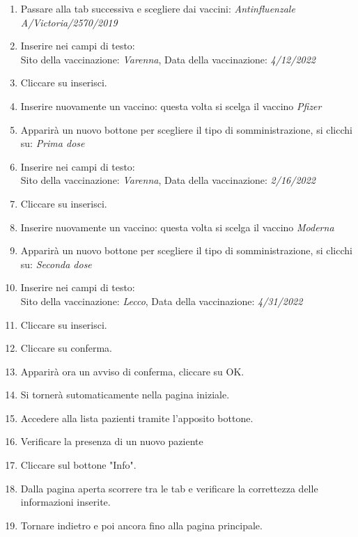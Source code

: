 \documentclass[11pt]{article}
\begin{document}
\begin{enumerate}
                \item Passare alla tab successiva e scegliere dai vaccini: \textit{Antinfluenzale A/Victoria/2570/2019}
                \item Inserire nei campi di testo:\\
                        Sito della vaccinazione: \textit{Varenna}, Data della vaccinazione: \textit{4/12/2022}
                \item Cliccare su inserisci.
                \item Inserire nuovamente un vaccino: questa volta si scelga il vaccino \textit{Pfizer}
                \item Apparirà un nuovo bottone per scegliere il tipo di somministrazione, si clicchi su: \textit{Prima dose}
                \item Inserire nei campi di testo:\\
                    Sito della vaccinazione: \textit{Varenna}, Data della vaccinazione: \textit{2/16/2022}
                \item Cliccare su inserisci.
                \item Inserire nuovamente un vaccino: questa volta si scelga il vaccino \textit{Moderna}
                \item Apparirà un nuovo bottone per scegliere il tipo di somministrazione, si clicchi su: \textit{Seconda dose}
                \item Inserire nei campi di testo:\\
                    Sito della vaccinazione: \textit{Lecco}, Data della vaccinazione: \textit{4/31/2022}
                \item Cliccare su inserisci.
                \item Cliccare su conferma.
                \item Apparirà ora un avviso di conferma, cliccare su OK.
                \item Si tornerà sutomaticamente nella pagina iniziale. 
                \item Accedere alla lista pazienti tramite l'apposito bottone.
                \item Verificare la presenza di un nuovo paziente
                \item Cliccare sul bottone "Info".
                \item Dalla pagina aperta scorrere tra le tab e verificare la correttezza delle informazioni inserite.
                \item Tornare indietro e poi ancora fino alla pagina principale.

\end{enumerate}
\end{document}
